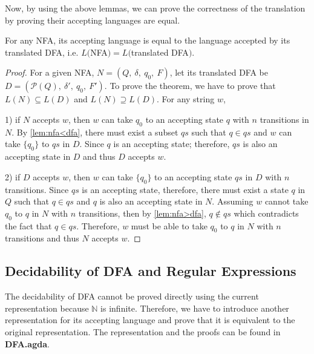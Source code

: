 \par Now, by using the above lemmas, we can prove the correctness of
the translation by proving their accepting languages are equal. 

\begin{thm}
\noindent For any NFA, its accepting language is equal to
the language accepted by its translated DFA, i.e. \(L(\)NFA\()
= L(\)translated DFA\()\). 
\end{thm}

\begin{proof}
\noindent For a given NFA, \(N = (Q,\ \delta,\ q_0,\ F)\), let its
translated DFA be \(D = (\mathcal P \left({Q}\right),\ \delta',\
{q_0},\ F')\). To
prove the theorem, we have to prove that \(L(N) \subseteq L(D)\) and
\(L(N) \supseteq L(D)\). For any string \(w\), 

\par 1) if \(N\) accepts \(w\), then \(w\) can take \(q_0\) to an
accepting state \(q\) with \(n\) transitions in \(N\). By
\autoref{lem:nfa<dfa}, there must exist a subset \(qs\) such that
\(q \in qs\) and \(w\)
can take \(\{q_0\}\) to \(qs\) in \(D\). Since \(q\) is
an accepting state; therefore, \(qs\) is also an accepting state in
\(D\) and thus \(D\) accepts \(w\). 

\par 2) if \(D\) accepts \(w\), then \(w\) can take
\(\{q_0\}\) to an accepting state \(qs\) in \(D\) with \(n\)
transitions. Since \(qs\) is an accepting state, therefore, there must
exist a state \(q\) in \(Q\) such that \(q \in qs\) and \(q\) is also
an accepting state in \(N\). Assuming \(w\) cannot take \(q_0\) to
\(q\) in \(N\) with \(n\) transitions, then by \autoref{lem:nfa>dfa},
\(q \notin qs\) which contradicts the fact that \(q \in
qs\). Therefore, \(w\) must be able to take \(q_0\) to \(q\) in \(N\)
with \(n\) transitions and thus \(N\) accepts \(w\). 
\end{proof}


\subsection{Decidability of DFA and Regular Expressions}
\par The decidability of DFA cannot be proved directly using the
current representation because \(\mathbb N\) is infinite. Therefore, we have to
introduce another representation for its accepting language and prove
that it is equivalent to the original representation. The
representation and the proofs can be found in \textbf{DFA.agda}. 


